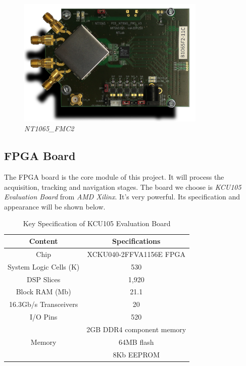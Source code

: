\begin{figure}[!htbp]
    \centering
    \includegraphics[width=0.8\textwidth]{_IMAGES/fmc-2-nt1065.png}
    \caption{\textit{NT1065\_FMC2}}
    \label{fig:nt1065}
\end{figure}

\subsection{FPGA Board}
The FPGA board is the core module of this project. It will process the acquisition, tracking and navigation stages. The board we choose is \textit{KCU105 Evaluation Board} from \textit{AMD Xilinx}. It's very powerful. Its specification and appearance will be shown below.

\begin{table}[!htbp]
\centering
\caption{Key Specification of KCU105 Evaluation Board}
\label{tab:kcu105}
\renewcommand\arraystretch{1.5}
\begin{tabular}{cc}
    \toprule
    Content & Specifications \\
    \midrule
    Chip & XCKU040-2FFVA1156E FPGA \\
    System Logic Cells (K) & 530 \\
    DSP Slices & 1,920 \\
    Block RAM (Mb) & 21.1 \\
    16.3Gb/s Transceivers & 20 \\
    I/O Pins & 520 \\
    \multirow{3}{*}{Memory} & 2GB DDR4 component memory \\
     & 64MB flash \\
     & 8Kb EEPROM \\
     \bottomrule
\end{tabular}
\end{table}

